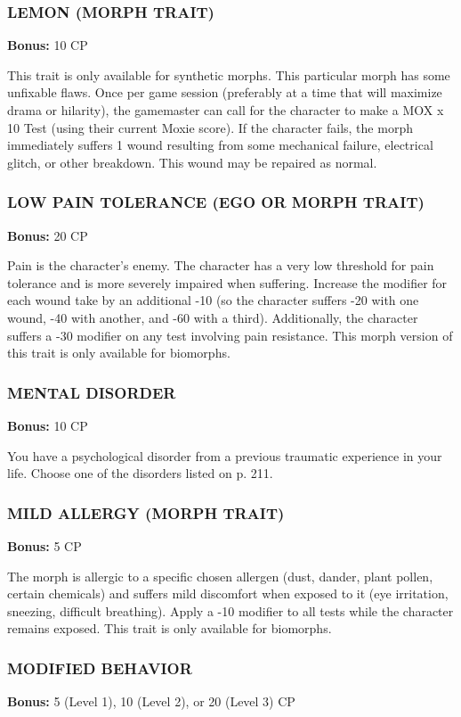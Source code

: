 \subsubsection{LEMON (MORPH TRAIT)}
\textbf{Bonus:} 10 CP

This trait is only available for synthetic morphs.  This particular morph has
some unfixable flaws. Once per game session (preferably at a time that will
maximize drama or hilarity), the gamemaster can call for the character to
make a MOX x 10 Test (using their current Moxie score). If the character fails,
the morph immediately suffers 1 wound resulting from some mechanical failure,
electrical glitch, or other breakdown.  This wound may be repaired as normal.

\subsubsection{LOW PAIN TOLERANCE (EGO OR MORPH TRAIT)}
\textbf{Bonus:} 20 CP

Pain is the character’s enemy. The character has a very low threshold for pain
tolerance and is more severely impaired when suffering. Increase the modifier
for each wound take by an additional -10 (so the character suffers -20 with one
wound, -40 with another, and -60 with a third). Additionally, the character
suffers a -30 modifier on any test involving pain resistance. This morph
version of this trait is only available for biomorphs.

\subsubsection{MENTAL DISORDER}
\textbf{Bonus:} 10 CP

You have a psychological disorder from a previous traumatic experience in your
life. Choose one of the disorders listed on p. 211.

\subsubsection{MILD ALLERGY (MORPH TRAIT)}
\textbf{Bonus:} 5 CP

The morph is allergic to a specific chosen allergen (dust, dander, plant
pollen, certain chemicals) and suffers mild discomfort when exposed to it
(eye irritation, sneezing, difficult breathing). Apply a -10 modifier to all
tests while the character remains exposed. This trait is only available for
biomorphs.

\subsubsection{MODIFIED BEHAVIOR}
\textbf{Bonus:} 5 (Level 1), 10 (Level 2), or 20 (Level 3) CP


